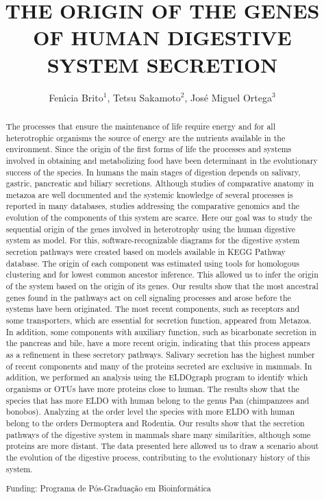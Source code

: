\documentclass[twoside]{article}
\title{\vspace{-15mm}\fontsize{24pt}{10pt}\selectfont\textbf{THE ORIGIN OF THE GENES OF HUMAN DIGESTIVE SYSTEM SECRETION}} %
\author{Fen\'{\i}cia Brito$^1$, Tetsu Sakamoto$^2$, Jos\'e Miguel Ortega$^3$}
\affil{1 UFMG\\ 2 UFMG. LABORAT\'ORIO DE BIODADOS.\\ 3 UFMG, LABORAT\'ORIO DE BIODADOS.\\ }
\date{}
\begin{document}
\maketitle %

\thispagestyle{fancy} %


\begin{abstract}
The processes that ensure the maintenance of life require energy and for all heterotrophic organisms the source of energy are the nutrients available in the environment. Since the origin of the first forms of life the processes and systems involved in obtaining and metabolizing food have been determinant in the evolutionary success of the species. In humans the main stages of digestion depends on salivary, gastric, pancreatic and biliary secretions. Although studies of comparative anatomy in metazoa are well documented and the systemic knowledge of several processes is reported in many databases, studies addressing the comparative genomics and the evolution of the components of this system are scarce. Here our goal was to study the sequential origin of the genes involved in heterotrophy using the human digestive system as model. For this, software-recognizable diagrams for the digestive system secretion pathways were created based on models available in KEGG Pathway database. The origin of each component was estimated using tools for homologous clustering and for lowest common ancestor inference. This allowed us to infer the origin of the system based on the origin of its genes. Our results show that the most ancestral genes found in the pathways act on cell signaling processes and arose before the systems have been originated. The most recent components, such as receptors and some transporters, which are essential for secretion function, appeared from Metazoa. In addition, some components with auxiliary function, such as bicarbonate secretion in the pancreas and bile, have a more recent origin, indicating that this process appears as a refinement in these secretory pathways. Salivary secretion has the highest number of recent components and many of the proteins secreted are exclusive in mammals. In addition, we performed an analysis using the ELDOgraph program to identify which organisms or OTUs have more proteins close to human. The results show that the species that has more ELDO with human belong to the genus Pan (chimpanzees and bonobos). Analyzing at the order level the species with more ELDO with human belong to the orders Dermoptera and Rodentia. Our results show that the secretion pathways of the digestive system in mammals share many similarities, although some proteins are more distant. The data presented here allowed us to draw a scenario about the evolution of the digestive process, contributing to the evolutionary history of this system.

Funding: Programa de P\'os-Gradua\c{c}\~ao em Bioinform\'atica
\end{abstract}
\end{document}
